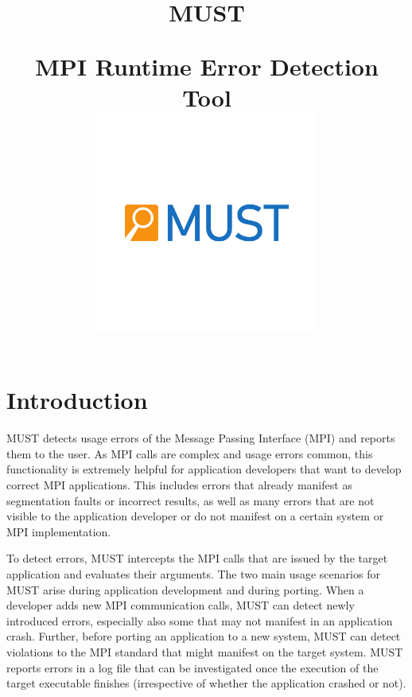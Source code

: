 \documentclass[english]{scrartcl}
\begin{document}
\title{\textsf{\textcolor{blue}{\Huge}}\\
\begin{center}
MUST
\end{center}
\textsf{\large MPI Runtime Error Detection Tool}\\
\vspace{8ex}
\centering\includegraphics[width=0.55\textwidth]{logo.pdf}
}
\maketitle

\newpage{}

\tableofcontents{}

\newpage{}

\section{Introduction}

MUST detects usage errors of the Message Passing Interface (MPI) and reports
them to the user.
As MPI calls are complex and usage errors common, this functionality is
extremely helpful for application developers that want to develop correct MPI applications.
This includes errors that already manifest as segmentation faults or incorrect
results, as well as many errors that are not visible to the application
developer or do not manifest on a certain system or MPI implementation. 

To detect errors, MUST intercepts the MPI calls that are issued by the target
application and evaluates their arguments. The two main usage
scenarios for MUST arise during application development and during porting.
When a developer adds new MPI communication calls, MUST can detect
newly introduced errors, especially  also some that may not manifest in an
application crash. Further,
before porting an application to a new system, MUST can detect violations to the
MPI standard that might manifest on the target system. MUST reports errors
in a log file that can be investigated once the execution of the target
executable finishes (irrespective of whether the application crashed or not).
\end{document}
